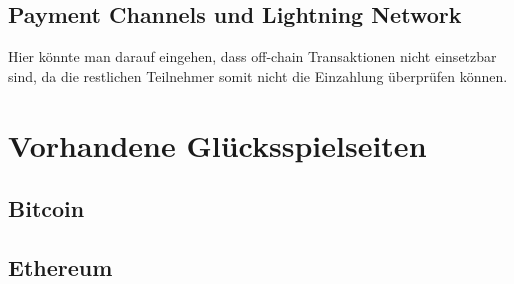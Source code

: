 \section{Payment Channels und Lightning Network}
Hier könnte man darauf eingehen, dass off-chain Transaktionen nicht einsetzbar sind, da die restlichen Teilnehmer somit nicht die Einzahlung überprüfen können.

\chapter{Vorhandene Glücksspielseiten}
\section{Bitcoin}

\section{Ethereum}